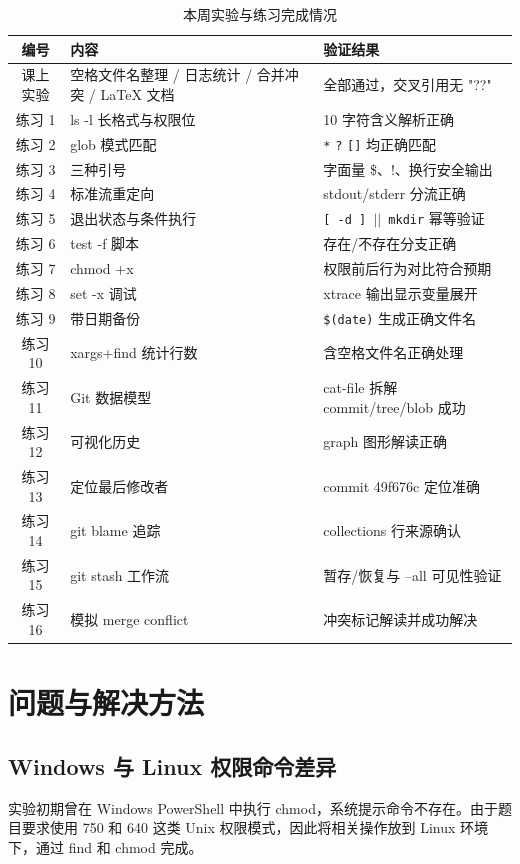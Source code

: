 \documentclass[UTF8]{ctexart}
\begin{document}
\begin{table}[H]
\centering
\caption{本周实验与练习完成情况}
\label{tab:summary}
\begin{tabular}{clp{6.2cm}}
\toprule
编号 & 内容 & 验证结果 \\
\midrule
课上实验 & 空格文件名整理 / 日志统计 / 合并冲突 / LaTeX 文档 & 全部通过，交叉引用无 "??" \\
练习 1 & ls -l 长格式与权限位 & 10 字符含义解析正确 \\
练习 2 & glob 模式匹配 & \texttt{*} \texttt{?} \texttt{[]} 均正确匹配 \\
练习 3 & 三种引号 & 字面量 \$、!、换行安全输出 \\
练习 4 & 标准流重定向 & stdout/stderr 分流正确 \\
练习 5 & 退出状态与条件执行 & \texttt{[\ -d\ ] $||$ mkdir} 幂等验证 \\
练习 6 & test -f 脚本 & 存在/不存在分支正确 \\
练习 7 & chmod +x & 权限前后行为对比符合预期 \\
练习 8 & set -x 调试 & xtrace 输出显示变量展开 \\
练习 9 & 带日期备份 & \texttt{\$(date)} 生成正确文件名 \\
练习 10 & xargs+find 统计行数 & 含空格文件名正确处理 \\
练习 11 & Git 数据模型 & cat-file 拆解 commit/tree/blob 成功 \\
练习 12 & 可视化历史 & graph 图形解读正确 \\
练习 13 & 定位最后修改者 & commit 49f676c 定位准确 \\
练习 14 & git blame 追踪 & collections 行来源确认 \\
练习 15 & git stash 工作流 & 暂存/恢复与 --all 可见性验证 \\
练习 16 & 模拟 merge conflict & 冲突标记解读并成功解决 \\
\bottomrule
\end{tabular}
\end{table}

\section{问题与解决方法}

\subsection{Windows 与 Linux 权限命令差异}

实验初期曾在 Windows PowerShell 中执行 chmod，系统提示命令不存在。由于题目要求使用 750 和 640
这类 Unix 权限模式，因此将相关操作放到 Linux 环境下，通过 find 和 chmod 完成。
\end{document}

